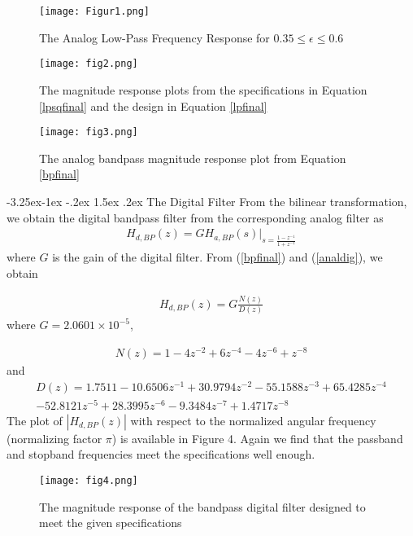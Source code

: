 \documentclass[article]{IEEEtran}
\makeatletter
\theoremstyle{remark}
\numberwithin{equation}{subsection}
\renewcommand\subsection{\@startsection{subsection}{2}{\z@}%
    {-3.25ex\@plus -1ex \@minus -.2ex}%
    {1.5ex \@plus .2ex}%
    {\normalfont\large\bfseries}}
\makeatother
\begin{document}
\begin{figure}[!ht]
\centering
\texttt{[image: Figur1.png]}
\caption{The Analog Low-Pass Frequency Response for $0.35 \leq \epsilon \leq 0.6$}
\label{fig1}
\end{figure}

\begin{figure}[!ht]
\centering
\texttt{[image: fig2.png]}
\caption{The magnitude response plots from the specifications in Equation \ref{lpsqfinal} and the design in Equation \ref{lpfinal}}
\label{fig2}
\end{figure}

\begin{figure}[H]
\label{fig3}
\texttt{[image: fig3.png]}
\caption{The analog bandpass magnitude response plot from Equation \ref{bpfinal}} 
\end{figure}

\subsection{The Digital Filter}
From the bilinear transformation, we obtain the digital bandpass filter from the corresponding analog filter as
\begin{eqnarray}
\label{analdig}
H_{d,BP}(z) = GH_{a,BP}(s)\vert_{s = \frac{1-z^{-1}}{1 + z^{-1}}}
\end{eqnarray}
where $G$ is the gain of the digital filter.  From (\ref{bpfinal}) and (\ref{analdig}), we obtain

\begin{eqnarray}
H_{d,BP}(z) = G \frac{N(z)}{D(z)}
\end{eqnarray}
where $G =  2.0601\times 10^{-5}$,

\begin{eqnarray}
N(z)=  1 - 4 z^{-2} + 6 z^{-4} - 4z^{-6} + z^{-8} 
\end{eqnarray}
and
{\small
\begin{eqnarray}
D(z) = 1.7511  -10.6506z^{-1} + 30.9794z^{-2}  -55.1588z^{-3}+  65.4285z^{-4}\nonumber \\
  -52.8121z^{-5}+   28.3995z^{-6}  -9.3484z^{-7} +   1.4717z^{-8}
\end{eqnarray}
}
The plot of $|H_{d,BP}(z)|$ with respect to the normalized angular frequency (normalizing factor $\pi$) is available in Figure 4.  Again we
find that the passband and stopband frequencies meet the specifications well enough.

\begin{figure}[H]
\label{fig4}
\centering
\texttt{[image: fig4.png]}
\caption{The magnitude response of the bandpass digital filter designed to meet the given specifications} 
\end{figure}
\end{document}
